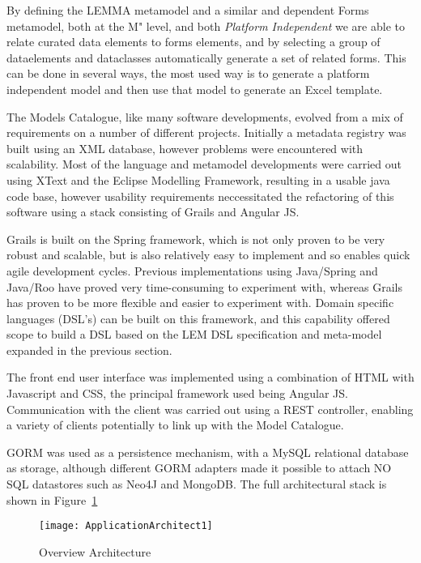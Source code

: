 By defining the LEMMA metamodel and a similar and dependent Forms
metamodel, both at the M" level, and both \emph{Platform Independent}
we are able to relate curated data elements to forms elements, and by
selecting a group of dataelements and dataclasses automatically
generate a set of related forms. This can be done in several ways, the
most used way is to generate a platform independent model and then use
that model to generate an Excel template.

The Models Catalogue, like many software developments, evolved from a
mix of requirements on a number of different projects.  Initially a
metadata registry was built using an XML database, however problems
were encountered with scalability.  Most of the language and metamodel
developments were carried out using XText and the Eclipse Modelling
Framework, resulting in a usable java code base, however usability
requirements neccessitated the refactoring of this software using a
stack consisting of Grails and Angular JS.

Grails is built on the Spring framework, which is not only proven to
be very robust and scalable, but is also relatively easy to implement
and so enables quick agile development cycles. Previous
implementations using Java/Spring and Java/Roo have proved very
time-consuming to experiment with, whereas Grails has proven to be
more flexible and easier to experiment with.  Domain specific
languages (DSL’s) can be built on this framework, and this capability
offered scope to build a DSL based on the LEM DSL specification and
meta-model expanded in the previous section.
 
The front end user interface was implemented using a combination of
HTML with Javascript and CSS, the principal framework used being
Angular JS. Communication with the client was carried out using a REST
controller, enabling a variety of clients potentially to link up with
the Model Catalogue.

GORM was used as a persistence mechanism, with a MySQL relational
database as storage, although different GORM adapters made it possible
to attach NO SQL datastores such as Neo4J and MongoDB. The full
architectural stack is shown in
Figure~\ref{fig:ApplicationArchitectMDR}

\begin{figure}[here]
  \texttt{[image: ApplicationArchitect1]}
  \caption{Overview Architecture} 
  \label{fig:ApplicationArchitectMDR}
\end{figure}


